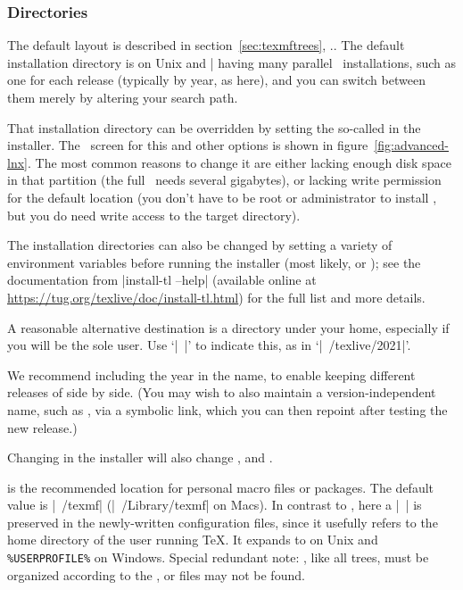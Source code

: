 \documentclass{article}
\begin{document}
\subsubsection{Directories}
\label{sec:directories}

The default layout is described in section~\ref{sec:texmftrees},
\p.\pageref{sec:texmftrees}.  The default installation directory is
 on Unix and
|%
having many parallel \TL\ installations, such as one for each release
(typically by year, as here), and you can switch between them merely by
altering your search path.

That installation directory can be overridden by setting the so-called
 in the installer.  The \GUI\ screen for this and other
options is shown in figure~\ref{fig:advanced-lnx}.  The most common reasons
to change it are either lacking enough disk space in that partition (the
full \TL\ needs several gigabytes), or lacking write permission for the
default location (you don't have to be root or administrator to install
\TL, but you do need write access to the target directory).

The installation directories can also be changed by setting a variety of
environment variables before running the installer (most likely,
 or
); see the documentation from
|install-tl --help| (available online at
\url{https://tug.org/texlive/doc/install-tl.html}) for the full list and
more details.

A reasonable alternative destination is a directory under your home,
especially if you will be the sole user. Use `|~|' to indicate this, as
in `|~/texlive/2021|'.

We recommend including the year in the name, to enable keeping different
releases of \TL{} side by side.  (You may wish to also maintain a
version-independent name, such as , via a
symbolic link, which you can then repoint after testing the new release.)

Changing  in the installer will also change
,  and
.

 is the recommended location for personal macro files
or packages.  The default value is |~/texmf| (|~/Library/texmf| on
Macs).  In contrast to , here a |~| is preserved in the
newly-written configuration files, since it usefully refers to the home
directory of the user running \TeX.  It expands to  on
Unix and \verb|%USERPROFILE%| on Windows.  Special redundant note:
, like all trees, must be organized according to the
\TDS, or files may not be found.
\end{document}
